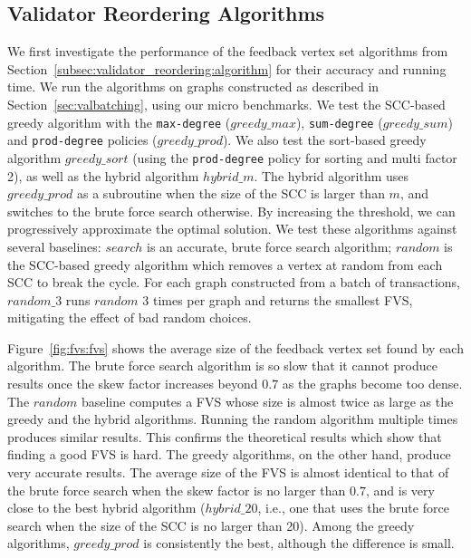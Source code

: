 \subsection{Validator Reordering Algorithms}
\label{sec:exp_algorithms}
We first investigate the performance of the feedback vertex set algorithms from Section~\ref{subsec:validator_reordering:algorithm} 
for their accuracy and running time. We run the algorithms on graphs constructed as described in Section~\ref{sec:valbatching}, using our micro benchmarks. 
We test the SCC-based greedy algorithm with the \texttt{max-degree} ($greedy\_max$), \texttt{sum-degree} ($greedy\_sum$) and \texttt{prod-degree} policies ($greedy\_prod$). We also test the sort-based greedy algorithm $greedy\_sort$ (using the \texttt{prod-degree} policy for sorting and multi factor 2), as well as the hybrid algorithm $hybrid\_m$. The hybrid algorithm uses $greedy\_prod$ as a subroutine when the size of the SCC is larger than $m$, and switches to the brute force search otherwise. By increasing the threshold, we can progressively approximate the optimal solution. 
We test these algorithms against several baselines: $search$ is an accurate,
brute force search algorithm; $random$ is the SCC-based greedy algorithm which
removes a vertex at random from each SCC to break the cycle. For each graph constructed from a batch of transactions,
$random\_3$ runs $random$ 3 times per graph and returns the smallest FVS, mitigating the
effect of bad random choices.

Figure~\ref{fig:fvs:fvs} shows the average size of the feedback vertex set found by each algorithm. The brute force search algorithm is so slow that it cannot produce results once the skew factor increases beyond $0.7$ as the graphs become too dense.
The $random$ baseline computes a FVS whose size is almost twice as large as the greedy and the hybrid algorithms. Running the random algorithm multiple times produces similar results. This confirms the theoretical results which show that finding a good FVS is hard. The greedy algorithms, on the other hand, produce very accurate results. The average size of the FVS is almost identical to that of the brute force search when the skew factor is no larger than $0.7$, and is very close to the best hybrid algorithm ($hybrid\_20$, i.e., one that uses the brute force search when the size of the SCC is no larger than 20). Among the greedy algorithms, $greedy\_prod$ is consistently the best, although the difference is small.

